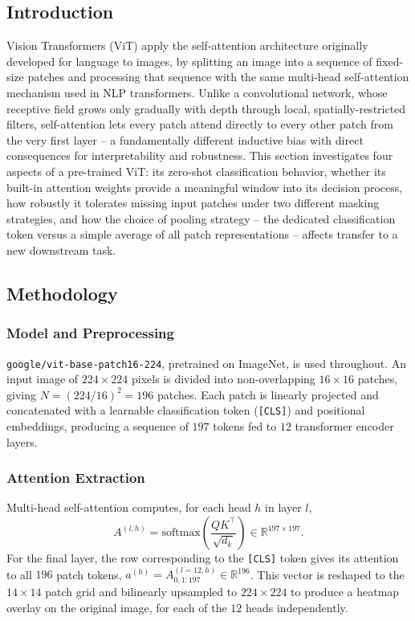 \subsection{Introduction}

Vision Transformers (ViT) apply the self-attention architecture originally
developed for language to images, by splitting an image into a sequence of
fixed-size patches and processing that sequence with the same multi-head
self-attention mechanism used in NLP transformers. Unlike a convolutional
network, whose receptive field grows only gradually with depth through
local, spatially-restricted filters, self-attention lets every patch attend
directly to every other patch from the very first layer -- a fundamentally
different inductive bias with direct consequences for interpretability and
robustness. This section investigates four aspects of a pre-trained ViT:
its zero-shot classification behavior, whether its built-in attention
weights provide a meaningful window into its decision process, how
robustly it tolerates missing input patches under two different masking
strategies, and how the choice of pooling strategy -- the dedicated
classification token versus a simple average of all patch representations
-- affects transfer to a new downstream task.

\subsection{Methodology}

\subsubsection{Model and Preprocessing}

\texttt{google/vit-base-patch16-224}, pretrained on ImageNet, is used
throughout. An input image of $224\times224$ pixels is divided into
non-overlapping $16\times16$ patches, giving
$N=(224/16)^2=196$ patches. Each patch is linearly projected and
concatenated with a learnable classification token (\texttt{[CLS]}) and
positional embeddings, producing a sequence of $197$ tokens fed to $12$
transformer encoder layers.

\subsubsection{Attention Extraction}

Multi-head self-attention computes, for each head $h$ in layer $l$,
\[
  A^{(l,h)} = \mathrm{softmax}\!\left(\frac{QK^\top}{\sqrt{d_k}}\right) \in \mathbb{R}^{197\times197}.
\]
For the final layer, the row corresponding to the \texttt{[CLS]} token
gives its attention to all $196$ patch tokens,
$a^{(h)} = A^{(l=12,h)}_{0,1:197} \in \mathbb{R}^{196}$. This vector is
reshaped to the $14\times14$ patch grid and bilinearly upsampled to
$224\times224$ to produce a heatmap overlay on the original image, for each
of the $12$ heads independently.

